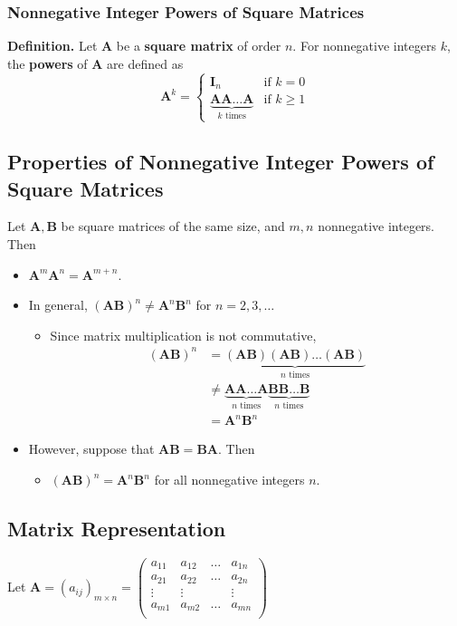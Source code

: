 \documentclass[../ma2001_notes.tex]{subfiles}
\begin{document}
\subsubsection{Nonnegative Integer Powers of Square Matrices}
\textbf{Definition.} Let \(\bm{A}\) be a \textbf{square matrix} of order \(n\). For nonnegative integers \(k\), the \textbf{powers} of \(\bm{A}\) are defined as
\[\bm{A}^k=\begin{cases}
	\bm{I}_n & \text{if } k=0 \\
	\underbrace{\bm{A}\bm{A}\ldots\bm{A}}_{k\text{ times}} & \text{if } k\geq1
\end{cases}\]

\subsection{Properties of Nonnegative Integer Powers of Square Matrices}
Let \(\bm{A},\bm{B}\) be square matrices of the same size, and \(m,n\) nonnegative integers. Then
\begin{itemize}
	\item\(\bm{A}^m\bm{A}^n=\bm{A}^{m+n}\).
	\item In general, \((\bm{A}\bm{B})^n\ne\bm{A}^n\bm{B}^n\) for \(n=2,3,\ldots\)
	\begin{itemize}
		\item Since matrix multiplication is not commutative,
		\begin{align*}
			(\bm{A}\bm{B})^n
			&=\underbrace{(\bm{A}\bm{B})(\bm{A}\bm{B})\ldots(\bm{A}\bm{B})}_{n\text{ times}} \\
			&\ne\underbrace{\bm{A}\bm{A}\ldots\bm{A}}_{n\text{ times}}\underbrace{\bm{B}\bm{B}\ldots\bm{B}}_{n\text{ times}} \\
			&=\bm{A}^n\bm{B}^n
		\end{align*}
	\end{itemize}
	\item However, suppose that \(\bm{A}\bm{B}=\bm{B}\bm{A}\). Then
	\begin{itemize}
		\item\((\bm{A}\bm{B})^n=\bm{A}^n\bm{B}^n\) for all nonnegative integers \(n\).
	\end{itemize}
\end{itemize}

\subsection{Matrix Representation}
Let \(\bm{A}=(a_{ij})_{m\times n}=\left(\begin{array}{cccc}
a_{11} & a_{12} & \ldots & a_{1n} \\ 
a_{21} & a_{22} & \ldots & a_{2n} \\ 
\vdots & \vdots & & \vdots \\ 
a_{m1} & a_{m2} & \ldots & a_{mn} \\
\end{array}\right)\)
\end{document}
